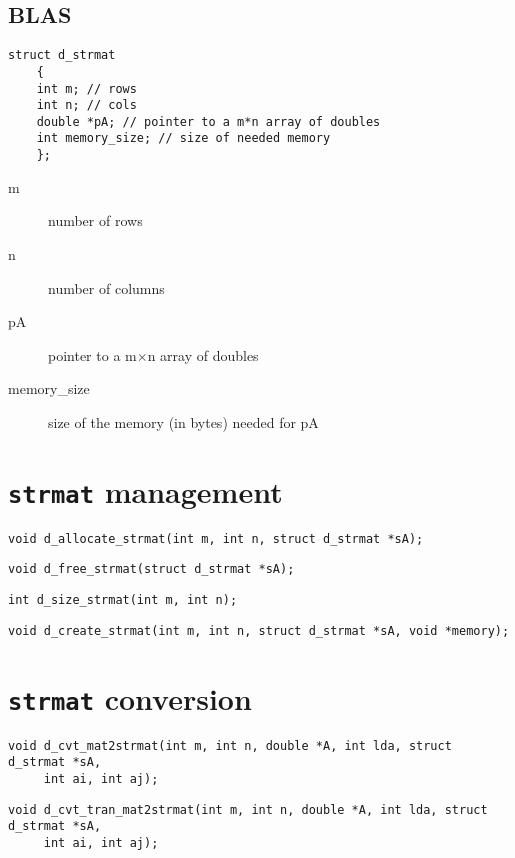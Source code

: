 \documentclass[a4paper]{report}
\begin{document}
\subsection{BLAS}

\begin{verbatim}
struct d_strmat 
	{
	int m; // rows
	int n; // cols
	double *pA; // pointer to a m*n array of doubles
	int memory_size; // size of needed memory
	};
\end{verbatim}
\begin{description}
\item[m] number of rows
\item[n] number of columns
\item[pA] pointer to a m$\times$n array of doubles
\item[memory\_size] size of the memory (in bytes) needed for pA
\end{description}



\section{{\tt strmat} management}

\begin{verbatim}
void d_allocate_strmat(int m, int n, struct d_strmat *sA);
\end{verbatim}

\begin{verbatim}
void d_free_strmat(struct d_strmat *sA);
\end{verbatim}

\begin{verbatim}
int d_size_strmat(int m, int n);
\end{verbatim}

\begin{verbatim}
void d_create_strmat(int m, int n, struct d_strmat *sA, void *memory);
\end{verbatim}



\section{{\tt strmat} conversion}

\begin{verbatim}
void d_cvt_mat2strmat(int m, int n, double *A, int lda, struct d_strmat *sA, 
     int ai, int aj);
\end{verbatim}

\begin{verbatim}
void d_cvt_tran_mat2strmat(int m, int n, double *A, int lda, struct d_strmat *sA, 
     int ai, int aj);
\end{verbatim}
\end{document}
